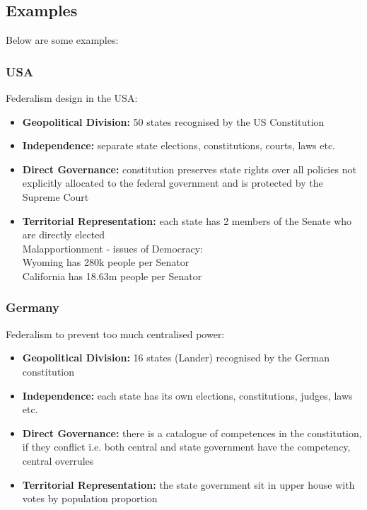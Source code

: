 \documentclass[12pt, letterpaper]{article}
\begin{document}
\subsection{Examples}
Below are some examples:
\subsubsection{USA}
Federalism design in the USA:
\begin{itemize}
	\item \textbf{Geopolitical Division:} 50 states recognised by the US Constitution
	\item \textbf{Independence:} separate state elections, constitutions, courts, laws etc.
	\item \textbf{Direct Governance:} constitution preserves state rights over all policies not explicitly allocated to the federal government and is protected by the Supreme Court
	\item \textbf{Territorial Representation:} each state has 2 members of the Senate who are directly elected\\
		Malapportionment - issues of Democracy:\\
		Wyoming has 280k people per Senator\\
		California has 18.63m people per Senator
\end{itemize}

\subsubsection{Germany}
Federalism to prevent too much centralised power:
\begin{itemize}
	\item \textbf{Geopolitical Division:} 16 states (Lander) recognised by the German constitution
	\item \textbf{Independence:} each state has its own elections, constitutions, judges, laws etc.
	\item \textbf{Direct Governance:} there is a catalogue of competences in the constitution, if they conflict i.e. both central and state government have the competency, central overrules
	\item \textbf{Territorial Representation:} the state government sit in upper house with votes by population proportion
\end{itemize}
\end{document}
